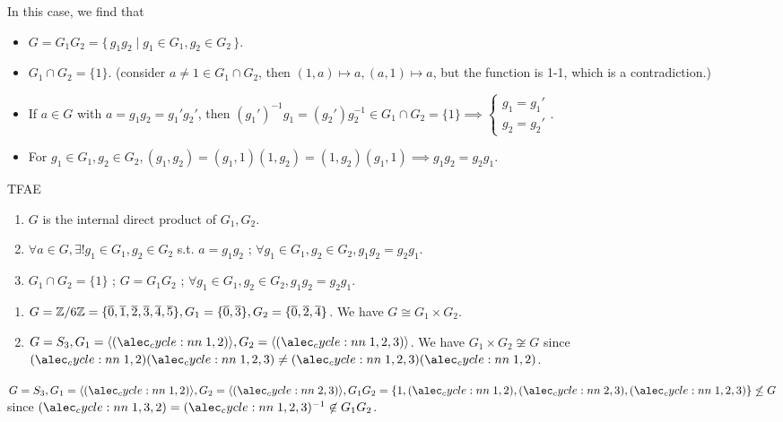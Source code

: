 \begin{remark}
  In this case, we find that
  \begin{itemize}
    \item $G = G_1 G_2 = \{\, g_1 g_2 \mid g_1 \in G_1, g_2 \in G_2 \,\}$.
    \item $G_1 \cap G_2 = \{ 1 \}$. (consider $a \ne 1 \in G_1 \cap G_2$, then
      $(1, a) \mapsto a, (a, 1) \mapsto a$, but the function is 1-1, which
      is a contradiction.)
    \item If $a \in G$ with $a = g_1g_2 = g_1'g_2'$, then
      $(g_1')^{-1}g_1 = (g_2')g_2^{-1} \in G_1 \cap G_2 = \{ 1 \} \implies
      \begin{cases} g_1 = g_1' \\ g_2 = g_2'\end{cases}$.
    \item For $g_1 \in G_1, g_2 \in G_2, (g_1, g_2) = (g_1, 1)(1, g_2) =
      (1, g_2)(g_1, 1) \implies g_1g_2 = g_2g_1$.
  \end{itemize}
\end{remark}

\begin{exercise} TFAE
  \begin{enumerate}
    \item $G$ is the internal direct product of $G_1, G_2$.
    \item $\forall a \in G, \exists! g_1 \in G_1, g_2 \in G_2$ s.t.
      $a = g_1g_2$ ; $\forall g_1 \in G_1, g_2 \in G_2, g_1g_2 = g_2g_1$.
    \item $G_1 \cap G_2 = \{ 1 \}$ ; $G = G_1G_2$ ;
      $\forall g_1 \in G_1, g_2 \in G_2, g_1g_2 = g_2g_1$.
  \end{enumerate}
\end{exercise}

\begin{example} \mbox{}
  \begin{enumerate}
    \item $G = {\mathbb{Z}}/{6\mathbb{Z}} = \{ \overline{0}, \overline{1}, \overline{2}, \overline{3}, \overline{4}, \overline{5} \},
      G_1 = \{ \overline{0}, \overline{3} \}, G_2 = \{ \overline{0}, \overline{2}, \overline{4} \}$.
      We have $G \cong G_1 \times G_2$.
    \item $G = S_3, G_1 = \gen{\cycle{1,2}}, G_2 = \gen{\cycle{1,2,3}}$.
      We have $G_1 \times G_2 \not\cong G$ since $\cycle{1,2}\cycle{1,2,3} \ne
      \cycle{1,2,3}\cycle{1,2}$.
  \end{enumerate}
\end{example}

\begin{example}
  $G = S_3, G_1 = \gen{\cycle{1,2}}, G_2 = \gen{\cycle{2,3}},
  G_1G_2 = \{ 1, \cycle{1,2}, \cycle{2,3}, \cycle{1,2,3} \} \not\le G$
  since $\cycle{1,3,2} = \cycle{1,2,3}^{-1} \not\in G_1G_2$.
\end{example}

